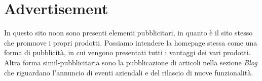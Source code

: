 \section{Advertisement}

In questo sito noon sono presenti elementi pubblicitari, in quanto è il sito 
stesso che promuove i propri prodotti. Possiamo intendere la homepage 
stessa come una forma di pubblicità, in cui vengono presentati tutti i 
vantaggi dei vari prodotti. Altra forma simil-pubblicitaria sono la 
pubblicazione di articoli nella sezione \textit{Blog} che riguardano 
l'annuncio di eventi aziendali e del rilascio di nuove funzionalità.